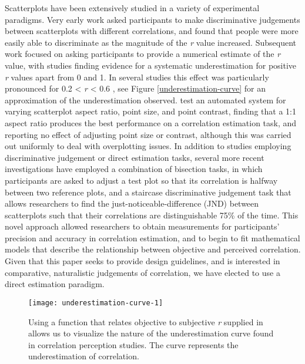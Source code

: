 \documentclass[preprint, 3p,
authoryear]{elsarticle} %
\begin{document}
Scatterplots have been extensively studied in a variety of experimental
paradigms. Very early work \citep{pollack_1960} asked participants to
make discriminative judgements between scatterplots with different
correlations, and found that people were more easily able to
discriminate as the magnitude of the \emph{r} value increased.
Subsequent work focused on asking participants to provide a numerical
estimate of the \emph{r} value, with studies finding evidence for a
systematic underestimation for positive \emph{r} values apart from 0 and
1. In several studies this effect was particularly pronounced for 0.2
\textless{} \emph{r} \textless{} 0.6
\citep{strahan_1978, bobko_1979, cleveland_1982, lane_1985, lauer_1989, collyer_1990, meyer_1992},
see Figure \ref{underestimation-curve} for an approximation of the
underestimation observed. \citet{micallef_2017} test an automated system
for varying scatterplot aspect ratio, point size, and point contrast,
finding that a 1:1 aspect ratio produces the best performance on a
correlation estimation task, and reporting no effect of adjusting point
size or contrast, although this was carried out uniformly to deal with
overplotting issues. In addition to studies employing discriminative
judgement or direct estimation tasks, several more recent investigations
have employed a combination of bisection tasks, in which participants
are asked to adjust a test plot so that its correlation is halfway
between two reference plots, and a staircase discriminative judgement
task that allows researchers to find the just-noticeable-difference
(JND) between scatterplots such that their correlations are
distinguishable 75\% of the time. This novel approach
\citep{rensink_2010} allowed researchers to obtain measurements for
participants' precision and accuracy in correlation estimation, and to
begin to fit mathematical models that describe the relationship between
objective and perceived correlation. Given that this paper seeks to
provide design guidelines, and is interested in comparative,
naturalistic judgements of correlation, we have elected to use a direct
estimation paradigm.

\begin{figure}

\texttt{[image: underestimation-curve-1]} \hfill{}

\caption{\label{underestimation-curve}Using a function that relates objective to subjective \textit{r} supplied in \cite{rensink_2017} allows us to visualize the nature of the underestimation curve found in correlation perception studies. The curve represents the underestimation of correlation.}\label{fig:underestimation-curve}
\end{figure}
\end{document}
